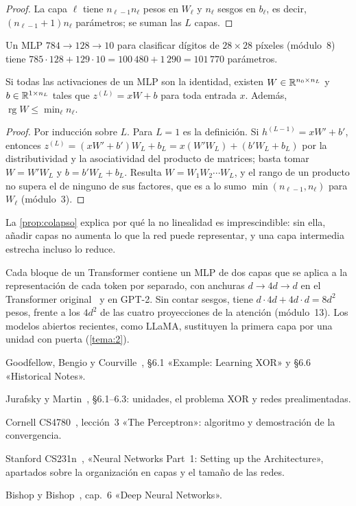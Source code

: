 \begin{proof}
La capa $\ell$ tiene $n_{\ell-1}n_\ell$ pesos en $W_\ell$ y $n_\ell$ sesgos en $b_\ell$, es decir, $(n_{\ell-1}+1)n_\ell$ parámetros; se suman las $L$ capas.
\end{proof}

\begin{ejemplo}\label{ej:mnist}
Un MLP $784\to 128\to 10$ para clasificar dígitos de $28\times 28$ píxeles (módulo~8) tiene $785\cdot 128+129\cdot 10=100\,480+1\,290=101\,770$ parámetros.
\end{ejemplo}

\begin{proposicion}\label{prop:colapso}
Si todas las activaciones de un MLP son la identidad, existen $W\in\mathbb{R}^{n_0\times n_L}$ y $b\in\mathbb{R}^{1\times n_L}$ tales que $z^{(L)}=xW+b$ para toda entrada $x$. Además, $\operatorname{rg}W\le\min_{\ell}n_\ell$.
\end{proposicion}

\begin{proof}
Por inducción sobre $L$. Para $L=1$ es la definición. Si $h^{(L-1)}=xW'+b'$, entonces $z^{(L)}=(xW'+b')W_L+b_L=x(W'W_L)+(b'W_L+b_L)$ por la distributividad y la asociatividad del producto de matrices; basta tomar $W=W'W_L$ y $b=b'W_L+b_L$. Resulta $W=W_1W_2\cdots W_L$, y el rango de un producto no supera el de ninguno de sus factores, que es a lo sumo $\min(n_{\ell-1},n_\ell)$ para $W_\ell$ (módulo~3).
\end{proof}

La \cref{prop:colapso} explica por qué la no linealidad es imprescindible: sin ella, añadir capas no aumenta lo que la red puede representar, y una capa intermedia estrecha incluso lo reduce.

\begin{observacion}
Cada bloque de un Transformer contiene un MLP de dos capas que se aplica a la representación de cada token por separado, con anchuras $d\to 4d\to d$ en el Transformer original~\cite{vaswani} y en GPT-2. Sin contar sesgos, tiene $d\cdot 4d+4d\cdot d=8d^{2}$ pesos, frente a los $4d^{2}$ de las cuatro proyecciones de la atención (módulo~13). Los modelos abiertos recientes, como LLaMA, sustituyen la primera capa por una unidad con puerta (\cref{tema:2}).
\end{observacion}

\begin{lecturas}
\item Goodfellow, Bengio y Courville~\cite{gbc}, §6.1 «Example: Learning XOR» y §6.6 «Historical Notes».
\item Jurafsky y Martin~\cite{jm3}, §6.1--6.3: unidades, el problema XOR y redes prealimentadas.
\item Cornell CS4780~\cite{cs4780}, lección~3 «The Perceptron»: algoritmo y demostración de la convergencia.
\item Stanford CS231n~\cite{cs231n}, «Neural Networks Part~1: Setting up the Architecture», apartados sobre la organización en capas y el tamaño de las redes.
\item Bishop y Bishop~\cite{bishopdl}, cap.~6 «Deep Neural Networks».
\end{lecturas}

